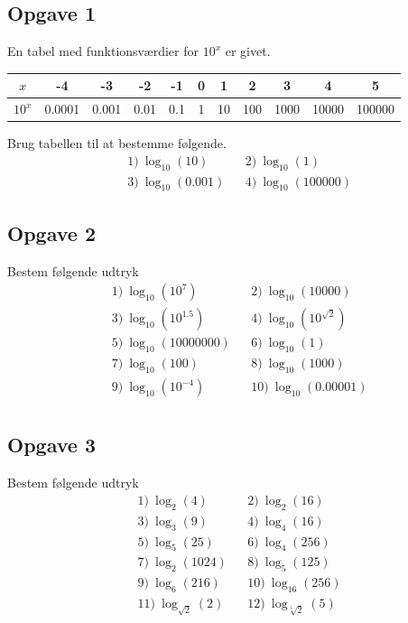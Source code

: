 \subsection*{Opgave 1}
En tabel med funktionsværdier for $10^x$ er givet.
\begin{table}[H]
	\centering
	\begin{tabular}{c|c|c|c|c|c|c|c|c|c|c}
		$x$ & -4 & -3 & -2 & -1 & 0 & 1 & 2 & 3 & 4 & 5 \\
		\hline
		$10^x$ & 0.0001 & 0.001 & 0.01& 0.1 & 1 & 10 & 100 & 1000 & 10000 & 100000
	\end{tabular}
\end{table}
Brug tabellen til at bestemme følgende.
\begin{align*}
	&1) \ \log_{10}(10)     &&2) \ \log_{10}(1)    \\
	&3) \ \log_{10}(0.001)     &&4) \  \log_{10}(100000)   
\end{align*}


\subsection*{Opgave 2}
Bestem følgende udtryk 
\begin{align*}
	&1) \ \log_{10}(10^7)    &&2) \ \log_{10}(10000)   \\  
	&3) \ \log_{10}(10^{1.5})   &&4) \ \log_{10}(10^{\sqrt{2}})     \\  
	&5) \ \log_{10}(10000000)   &&6) \ \log_{10}(1)   \\  
	&7) \ \log_{10}(100)			&&8) \ \log_{10}(1000)  \\
	&9) \ \log_{10}(10^{-4})     &&10) \ \log_{10}(0.00001) \\ 
\end{align*}

\subsection*{Opgave 3}
Bestem følgende udtryk
\begin{align*}
	&1) \ \log_2(4) &    &2) \ \log_2(16) \\
	&3) \ \log_3(9) &    &4) \ \log_4(16) \\
	&5) \ \log_5(25) &    &6) \ \log_4(256) \\
	&7) \ \log_2(1024) &    &8) \ \log_5(125) \\
	&9) \ \log_6(216) &    &10) \ \log_{16}(256) \\
	&11) \ \log_{\sqrt{2}}(2) &    &12) \ \log_{\sqrt[5]{2}}(5) \\
\end{align*}

